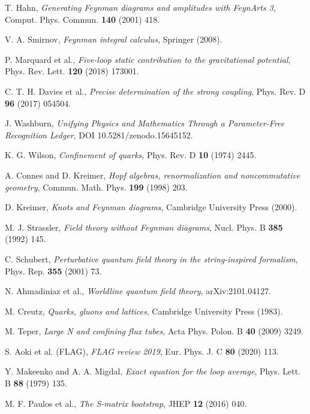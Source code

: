 \documentclass[11pt,a4paper]{article}
\theoremstyle{definition}
\theoremstyle{remark}
\begin{document}
\begin{thebibliography}{99}
 T. Hahn, \emph{Generating Feynman diagrams and amplitudes with FeynArts 3}, Comput. Phys. Commun. \textbf{140} (2001) 418.

 V. A. Smirnov, \emph{Feynman integral calculus}, Springer (2008).

 P. Marquard et al., \emph{Five-loop static contribution to the gravitational potential}, Phys. Rev. Lett. \textbf{120} (2018) 173001.

 C. T. H. Davies et al., \emph{Precise determination of the strong coupling}, Phys. Rev. D \textbf{96} (2017) 054504.

 J. Washburn, \emph{Unifying Physics and Mathematics Through a Parameter-Free Recognition Ledger}, DOI 10.5281/zenodo.15645152.

 K. G. Wilson, \emph{Confinement of quarks}, Phys. Rev. D \textbf{10} (1974) 2445.

 A. Connes and D. Kreimer, \emph{Hopf algebras, renormalization and noncommutative geometry}, Commun. Math. Phys. \textbf{199} (1998) 203.

 D. Kreimer, \emph{Knots and Feynman diagrams}, Cambridge University Press (2000).

 M. J. Strassler, \emph{Field theory without Feynman diagrams}, Nucl. Phys. B \textbf{385} (1992) 145.

 C. Schubert, \emph{Perturbative quantum field theory in the string-inspired formalism}, Phys. Rep. \textbf{355} (2001) 73.

 N. Ahmadiniaz et al., \emph{Worldline quantum field theory}, arXiv:2101.04127.

 M. Creutz, \emph{Quarks, gluons and lattices}, Cambridge University Press (1983).

 M. Teper, \emph{Large N and confining flux tubes}, Acta Phys. Polon. B \textbf{40} (2009) 3249.

 S. Aoki et al. (FLAG), \emph{FLAG review 2019}, Eur. Phys. J. C \textbf{80} (2020) 113.

 Y. Makeenko and A. A. Migdal, \emph{Exact equation for the loop average}, Phys. Lett. B \textbf{88} (1979) 135.

 M. F. Paulos et al., \emph{The S-matrix bootstrap}, JHEP \textbf{12} (2016) 040.


\end{thebibliography}
\end{document}
